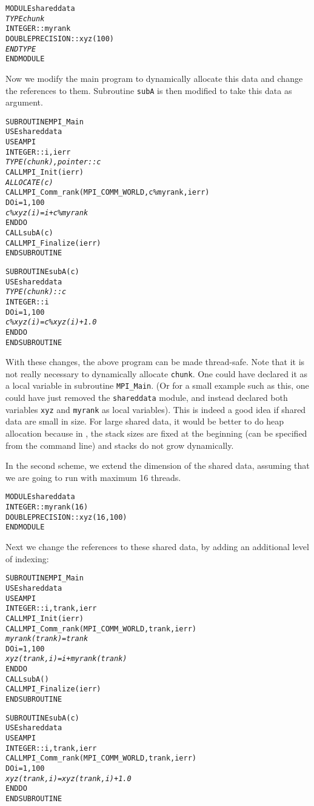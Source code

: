 \documentclass[10pt]{article}
\begin{document}
\begin{alltt}
MODULE shareddata
  \emph{TYPE chunk}
    INTEGER :: myrank
    DOUBLE PRECISION :: xyz(100)
  \emph{END TYPE}
END MODULE
\end{alltt}

Now we modify the main program to dynamically allocate this data and change the
references to them. Subroutine \texttt{subA} is then modified to take this data
as argument.

\begin{alltt}
SUBROUTINE MPI_Main
  USE shareddata
  USE AMPI
  INTEGER :: i, ierr
  \emph{TYPE(chunk), pointer :: c}
  CALL MPI_Init(ierr)
  \emph{ALLOCATE(c)}
  CALL MPI_Comm_rank(MPI_COMM_WORLD, c\%myrank, ierr)
  DO i = 1, 100
    \emph{c\%xyz(i) =  i + c\%myrank}
  END DO
  CALL subA(c)
  CALL MPI_Finalize(ierr)
END SUBROUTINE

SUBROUTINE subA(c)
  USE shareddata
  \emph{TYPE(chunk) :: c}
  INTEGER :: i
  DO i = 1, 100
    \emph{c\%xyz(i) = c\%xyz(i) + 1.0}
  END DO
END SUBROUTINE
\end{alltt}

With these changes, the above program can be made thread-safe. Note that it is
not really necessary to dynamically allocate \texttt{chunk}. One could have
declared it as a local variable in subroutine \texttt{MPI\_Main}.  (Or for a
small example such as this, one could have just removed the \texttt{shareddata}
module, and instead declared both variables \texttt{xyz} and \texttt{myrank} as
local variables). This is indeed a good idea if shared data are small in size.
For large shared data, it would be better to do heap allocation because in
\ampi{}, the stack sizes are fixed at the beginning (can be specified from the
command line) and stacks do not grow dynamically.

In the second scheme, we extend the dimension of the shared data, assuming that
we are going to run with maximum 16 threads.

\begin{alltt}
MODULE shareddata
  INTEGER :: myrank(16)
  DOUBLE PRECISION :: xyz(16, 100)
END MODULE
\end{alltt}

Next we change the references to these shared data, by adding an additional
level of indexing:

\begin{alltt}
SUBROUTINE MPI_Main
  USE shareddata
  USE AMPI
  INTEGER :: i, trank, ierr
  CALL MPI_Init(ierr)
  CALL MPI_Comm_rank(MPI_COMM_WORLD, trank, ierr)
  \emph{myrank(trank) = trank}
  DO i = 1, 100
    \emph{xyz(trank, i) =  i + myrank(trank)}
  END DO
  CALL subA()
  CALL MPI_Finalize(ierr)
END SUBROUTINE

SUBROUTINE subA(c)
  USE shareddata
  USE AMPI
  INTEGER :: i, trank, ierr
  CALL MPI_Comm_rank(MPI_COMM_WORLD, trank, ierr)
  DO i = 1, 100
    \emph{xyz(trank, i) = xyz(trank, i) + 1.0}
  END DO
END SUBROUTINE
\end{alltt}
\end{document}
